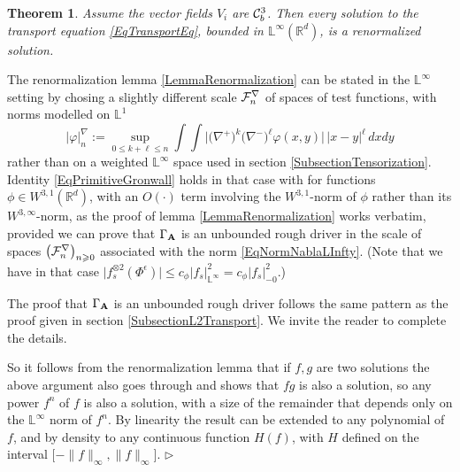 \documentclass[11pt,a4paper]{amsart}
\newcommand{\RR}{\mathbb{R}}  \newcommand{\CC}{\mathbb{C}}  \newcommand{\LL}{\mathbb{L}}  \newcommand{\WW}{\mathbb{W}}
\renewcommand{\leq}{\leqslant}
\renewcommand{\geq}{\geqslant}
\newcommand{\ssk}{\smallskip}
\newtheorem{thm}{\hspace{-0.15cm}  {\sc Theorem} } %
\numberwithin{equation}{section} %
\newenvironment{Dem}{%
    \begin{list}{\hspace{0.5cm}{\sc Proof --}}{%
        \setlength{\topsep}{0pt}%
        \setlength{\leftmargin}{0pt}%
        \setlength{\rightmargin}{0pt}%
        \setlength{\listparindent}{0pt}%
        \setlength{\itemindent}{0pt}%
        \setlength{\parsep}{0pt}%
        \addtolength{\leftmargin}{20pt}%
        \addtolength{\rightmargin}{0pt}%
    } \item }{\hfill{\space $\rhd$}\end{list}\smallskip}
\begin{document}
\begin{thm}
\label{ThmRenomalizedSolutions}
Assume the vector fields $V_i$ are $\mathcal{C}^3_b$. Then every solution to the transport equation \eqref{EqTransportEq}, bounded in $ \LL^\infty(\RR^d)$, is a renormalized solution.
\end{thm}
 
\medskip
 
\begin{Dem}  
The renormalization lemma \ref{LemmaRenormalization} can be stated in the $\LL^\infty$ setting by chosing a slightly different scale $\mathcal{F}^\nabla_n$ of spaces of test functions,  with norms modelled on $\LL^1$ 
\begin{equation}
\label{EqNormNablaLInfty} 
\big| \varphi \big|^\nabla_n := \sup_{0 \leqslant k + \ell \leqslant n} \int \int \Big|\big(\nabla^+\big)^k \big(\nabla^-\big)^\ell \varphi (x, y) \Big|\,|x-y|^\ell\,dx dy  
\end{equation}
rather than on a weighted $\LL^\infty$ space used in section \ref{SubsectionTensorization}. Identity \eqref{EqPrimitiveGronwall} holds in that case with for functions $\phi\in W^{3,1}(\RR^d)$, with an $O(\cdot)$ term involving the $W^{3,1}$-norm of $\phi$ rather than its $W^{3,\infty}$-norm, as the proof of lemma \ref{LemmaRenormalization} works verbatim, provided we can prove that $\Gamma_{\bf A}$ is an unbounded rough driver in the scale of spaces $\big(\mcF_n^\nabla\big)_{n\geq 0}$ associated with the norm \eqref{EqNormNablaLInfty}.  (Note that we have in that case $\big| f_s^{\otimes 2}(\Phi^\epsilon)\big| \leq c_\phi \big| f_s\big|_{\LL^\infty}^2 = c_\phi \big| f_s\big|_{-0}^2$.)

\medskip

The proof that $\Gamma_{\bf A}$ is an unbounded rough driver follows the same pattern as the proof given in section \ref{SubsectionL2Transport}. We invite the reader to complete the details.

\ssk

So it follows from the renormalization lemma that if $f, g$ are two solutions the above argument also goes through and shows that $fg$ is also a solution, so any power $f^n$ of $f$ is also a solution, with a size of the remainder that depends only on the $\LL^{\infty}$ norm of $f^n$. By linearity the result can be extended to any polynomial of $f$, and by density to any continuous function $H (f)$, with $H$ defined on the interval $\big[- \| f \|_{\infty}, \| f \|_{\infty}\big]$. 
\end{Dem}
 
\end{document}

